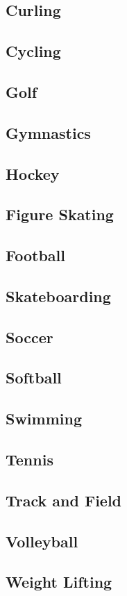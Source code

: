 \documentclass[12pt]{book}
\begin{document}
		\subsection{Curling}
		\subsection{Cycling}
		\subsection{Golf}
		\subsection{Gymnastics}
		\subsection{Hockey}
		\subsection{Figure Skating}
		\subsection{Football}
		\subsection{Skateboarding}		
		\subsection{Soccer}
		\subsection{Softball}
		\subsection{Swimming}
		\subsection{Tennis}
		\subsection{Track and Field}
		\subsection{Volleyball}
		\subsection{Weight Lifting}
		\newpage
\end{document}
